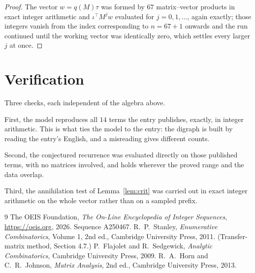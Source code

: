 \documentclass[11pt,a4paper]{article}
\theoremstyle{plain}
\theoremstyle{definition}
\begin{document}
\begin{proof}
The vector $w=q(M)\tau$ was formed by $67$ matrix--vector products in exact integer
arithmetic and $\iota^{\!\top}M^{j}w$ evaluated for $j=0,1,\dots$, again exactly; those
integers vanish from the index corresponding to $n=67+1$ onwards and the run continued
until the working vector was identically zero, which settles every larger $j$ at once.
\end{proof}

\section{Verification}

Three checks, each independent of the algebra above.

First, the model reproduces all $14$ terms the entry publishes, exactly, in integer
arithmetic. This is what ties the model to the entry: the digraph is built by reading the
entry's English, and a misreading gives different counts.

Second, the conjectured recurrence was evaluated directly on those published terms, with no
matrices involved, and holds wherever the proved range and the data overlap.

Third, the annihilation test of Lemma~\ref{lem:crit} was carried out in exact integer
arithmetic on the whole vector rather than on a sampled prefix.

\begin{thebibliography}{9}
 The OEIS Foundation, \emph{The On-Line Encyclopedia of Integer
Sequences}, \url{https://oeis.org}, 2026. Sequence A250467.
 R.~P.~Stanley, \emph{Enumerative Combinatorics}, Volume 1, 2nd ed.,
Cambridge University Press, 2011. (Transfer-matrix method, Section 4.7.)
 P.~Flajolet and R.~Sedgewick, \emph{Analytic Combinatorics}, Cambridge
University Press, 2009.
 R.~A.~Horn and C.~R.~Johnson, \emph{Matrix Analysis}, 2nd ed., Cambridge
University Press, 2013.
\end{thebibliography}
\end{document}
